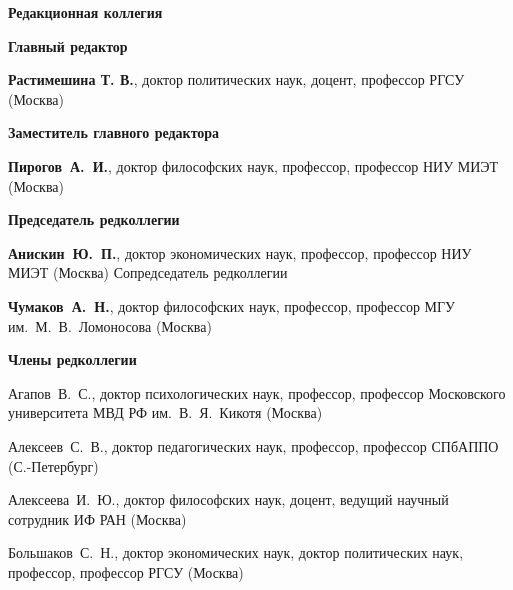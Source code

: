 


\vspace*{-4em}

\begin{center}
    \textbf{Редакционная коллегия}
\end{center}



\begin{multicols}{2}
   \begin{flushleft}
        
    \scriptsize

    \begin{center}
    \textbf{Главный редактор}
    \end{center}

    \noindent     \textbf{Растимешина Т. В.}, доктор политических наук, доцент, профессор РГСУ (Москва)

    \begin{center}
    \textbf{Заместитель главного редактора}
    \end{center}

    \noindent     \textbf{Пирогов А. И.}, доктор философских наук, профессор, профессор НИУ МИЭТ (Москва)
    
    \begin{center}
    \textbf{Председатель редколлегии}
    \end{center}
    
    \noindent     \textbf{Анискин Ю. П.}, доктор экономических наук, профессор, профессор НИУ МИЭТ (Москва)
    Сопредседатель редколлегии
    
    \noindent     \textbf{Чумаков А. Н.}, доктор философских наук, профессор, профессор МГУ им. М. В. Ломоносова (Москва) 

    \begin{center}
        \textbf{Члены редколлегии}
    \end{center}
    
    
    \noindent     Агапов В. С., доктор психологических наук, профессор, профессор Московского университета МВД РФ им. В. Я. Кикотя (Москва)
    
    \noindent    Алексеев С. В., доктор педагогических наук, профессор, профессор СПбАППО (С.-Петербург)
    
    \noindent     Алексеева И. Ю., доктор философских наук, доцент, ведущий научный сотрудник ИФ РАН (Москва)
    
    \noindent Большаков С. Н., доктор экономических наук, доктор политических наук, профессор, профессор РГСУ (Москва)
    

\end{flushleft}
\end{multicols}
